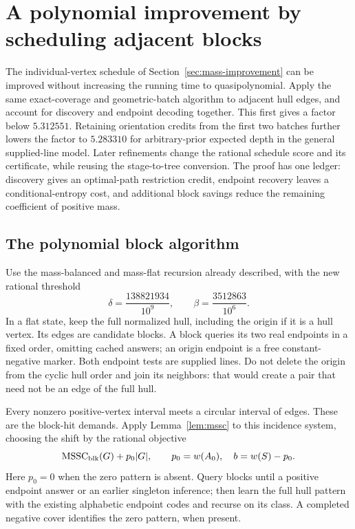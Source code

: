\section{A polynomial improvement by scheduling adjacent blocks}
\label{sec:polynomial-blocks}

The individual-vertex schedule of Section~\ref{sec:mass-improvement}
can be improved without increasing the running time to quasipolynomial.
Apply the same exact-coverage and geometric-batch algorithm to adjacent
hull edges, and account for discovery and endpoint decoding together.
This first gives a factor below $5.312551$. Retaining orientation
credits from the first two batches further lowers the factor to
$5.283310$ for arbitrary-prior expected depth in the general
supplied-line model. Later refinements change the rational schedule
score and its certificate, while reusing the stage-to-tree conversion.
The proof has one ledger: discovery gives an optimal-path restriction
credit, endpoint recovery leaves a conditional-entropy cost, and
additional block savings reduce the remaining coefficient of positive
mass.

\subsection{The polynomial block algorithm}

Use the mass-balanced and mass-flat recursion already described, with
the new rational threshold
\[
 \delta=\frac{138821934}{10^9},\qquad
 \beta=\frac{3512863}{10^6}.
\]
In a flat state, keep the full normalized hull, including the origin
if it is a hull vertex. Its edges are candidate blocks. A block queries
its two real endpoints in a fixed order, omitting cached answers; an
origin endpoint is a free constant-negative marker. Both endpoint tests
are supplied lines. Do not delete the origin from the cyclic hull order
and join its neighbors: that would create a pair that need not be an
edge of the full hull.

Every nonzero positive-vertex interval meets a circular interval of
edges. These are the block-hit demands. Apply
Lemma~\ref{lem:mssc} to this incidence system, choosing the shift by
the rational objective
\[
 \operatorname{MSSC}_{\mathrm{blk}}(G)+p_0|G|,
 \qquad p_0=w(A_0),\quad b=w(S)-p_0.
\]
Here $p_0=0$ when the zero pattern is absent. Query blocks until a
positive endpoint answer or an earlier singleton inference; then learn
the full hull pattern with the existing alphabetic endpoint codes and
recurse on its class. A completed negative cover identifies the zero
pattern, when present.

